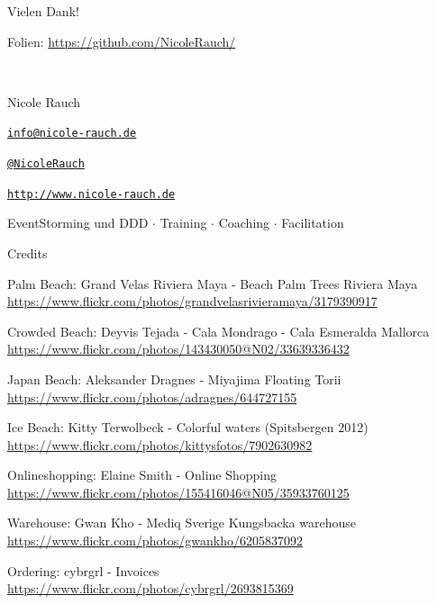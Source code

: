 \begin{frame}{Vielen Dank!}

        Folien: \url{https://github.com/NicoleRauch/} 
        
        ~\\[1em]
        \begin{block}{Nicole Rauch}
        \begin{description}[Twitterxx]
                \item[E-Mail]  \href{mailto:info@nicole-rauch.de}{\texttt{info@nicole-rauch.de}}
                \item[Twitter] \href{http://twitter.com/NicoleRauch}{\texttt{@NicoleRauch}}
                \item[Web] \href{http://www.nicole-rauch.de}{\texttt{http://www.nicole-rauch.de}}
        \end{description}
        \end{block}
        
        EventStorming und DDD $\cdot$ Training $\cdot$ Coaching $\cdot$ Facilitation
\end{frame}

\begin{frame}{Credits}

Palm Beach: Grand Velas Riviera Maya - Beach Palm Trees Riviera Maya \\
{\footnotesize \url{https://www.flickr.com/photos/grandvelasrivieramaya/3179390917}}

Crowded Beach: Deyvis Tejada - Cala Mondrago - Cala Esmeralda Mallorca  \\
{\footnotesize \url{https://www.flickr.com/photos/143430050@N02/33639336432}}

Japan Beach: Aleksander Dragnes - Miyajima Floating Torii  \\
{\footnotesize \url{https://www.flickr.com/photos/adragnes/644727155}}

Ice Beach: Kitty Terwolbeck - Colorful waters (Spitsbergen 2012)  \\
{\footnotesize \url{https://www.flickr.com/photos/kittysfotos/7902630982}}

Onlineshopping: Elaine Smith - Online Shopping \\
{\footnotesize \url{https://www.flickr.com/photos/155416046@N05/35933760125}}

Warehouse: Gwan Kho - Mediq Sverige Kungsbacka warehouse \\
{\footnotesize \url{https://www.flickr.com/photos/gwankho/6205837092}}

Ordering: cybrgrl - Invoices \\
{\footnotesize \url{https://www.flickr.com/photos/cybrgrl/2693815369}}


{\footnotesize \url{}}
{\footnotesize \url{}}
{\footnotesize \url{}}

\end{frame}


